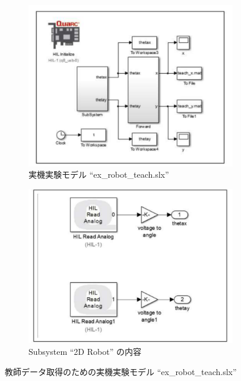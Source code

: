 \begin{figure}[H]
    \centering
    \begin{subfigure}[b]{0.48\linewidth}
        \centering
        \includegraphics[width=\linewidth]{figure/ex_robot_teach.pdf}
        \caption{実機実験モデル ``ex\_robot\_teach.slx''}
    \end{subfigure}
    \begin{subfigure}[b]{0.48\linewidth}
        \centering
        \includegraphics[width=\linewidth]{figure/ex_robot_teach_subsystem.pdf}
        \caption{Subsystem ``2D Robot'' の内容}
    \end{subfigure}
    \caption{教師データ取得のための実機実験モデル ``ex\_robot\_teach.slx''}
    \label{fig:ex_robot_teach}
\end{figure}

